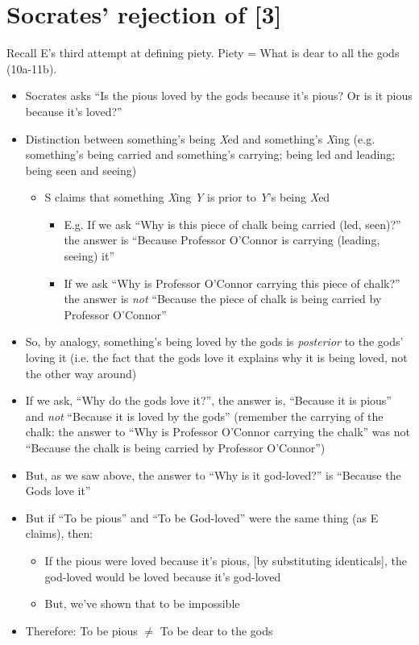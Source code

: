 \documentclass[11pt]{article}
\begin{document}
\section*{Socrates' rejection of [3]}
Recall E's third attempt at defining piety. Piety = What is dear to all the gods (10a-11b). 
\begin{itemize}
\item{Socrates asks ``Is the pious loved by the gods because it's pious? Or is it pious because it's loved?''}
\item{Distinction between something's being \emph{X}ed and something's \emph{X}ing (e.g. something's being carried and something's carrying; being led and leading; being seen and seeing)}

\begin{itemize}\item{S claims that something \emph{X}ing \emph{Y} is prior to \emph{Y}'s being \emph{X}ed}
\begin{itemize}\item{E.g. If we ask ``Why is this piece of chalk being carried (led, seen)?'' the answer is ``Because Professor O'Connor is carrying (leading, seeing) it''}\item{If we ask ``Why is Professor  O'Connor carrying this piece of chalk?'' the answer is \emph{not} ``Because the piece of chalk is being carried by Professor O'Connor''}\end{itemize}\end{itemize}
\item{So, by analogy, something's being loved by the gods is \emph{posterior} to the gods' loving it (i.e. the fact that the gods love it explains why it is being loved, not the other way around)}

\item{If we ask, ``Why do the gods love it?'', the answer is, ``Because it is pious'' and \emph{not} ``Because it is loved by the gods'' (remember the carrying of the chalk: the answer to ``Why is Professor O'Connor carrying the chalk'' was not ``Because the chalk is being carried by Professor O'Connor'')}

\item{But, as we saw above, the answer to ``Why is it god-loved?'' is ``Because the Gods love it''} \item{But if ``To be pious'' and ``To be God-loved'' were the same thing (as E claims), then:}\begin{itemize}\item{If the pious were loved because it's pious, [by substituting identicals], the god-loved would be loved because it's god-loved}\item{But, we've shown that to be impossible}\end{itemize}\item{Therefore: To be pious $\neq$ To be dear to the gods}

\end{itemize}
\end{document}
